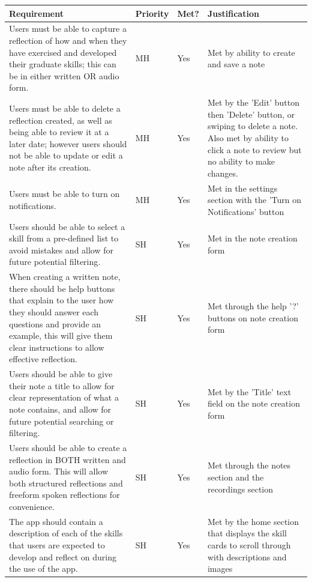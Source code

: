 \documentclass{l4proj}
\begin{document}
\begin{appendices}
\begin{center}
    \begin{longtable}{| m{} | m{}| m{} | m{} |} 
    \hline
    Requirement & Priority & Met? & Justification \\ [0.5ex] 
    \hline\hline
    Users must be able to capture a reflection of how and when they have exercised and developed their graduate skills; this can be in either written OR audio form. & MH & Yes & Met by ability to create and save a note \\ 
    \hline
    Users must be able to delete a reflection created, as well as being able to review it at a later date; however users should not be able to update or edit a note after its creation. & MH & Yes & Met by the 'Edit' button then 'Delete' button, or swiping to delete a note. Also met by ability to click a note to review but no ability to make changes. \\
    \hline
    Users must be able to turn on notifications. & MH & Yes & Met in the settings section with the 'Turn on Notifications' button \\
    \hline
    Users should be able to select a skill from a pre-defined list to avoid mistakes and allow for future potential filtering. & SH & Yes & Met in the note creation form \\
    \hline
    When creating a written note, there should be help buttons that explain to the user how they should answer each questions and provide an example, this will give them clear instructions to allow effective reflection. & SH & Yes & Met through the help '?' buttons on note creation form \\ [1ex] 
    \hline
    Users should be able to give their note a title to allow for clear representation of what a note contains, and allow for future potential searching or filtering. & SH & Yes & Met by the 'Title' text field on the note creation form \\ [1ex] 
    \hline
    Users should be able to create a reflection in BOTH written and audio form. This will allow both structured reflections and freeform spoken reflections for convenience. & SH & Yes & Met through the notes section and the recordings section \\ [1ex] 
    \hline
    The app should contain a description of each of the skills that users are expected to develop and reflect on during the use of the app. & SH & Yes & Met by the home section that displays the skill cards to scroll through with descriptions and images \\ [1ex] 

\end{longtable}
\end{center}
\end{appendices}
\end{document}
